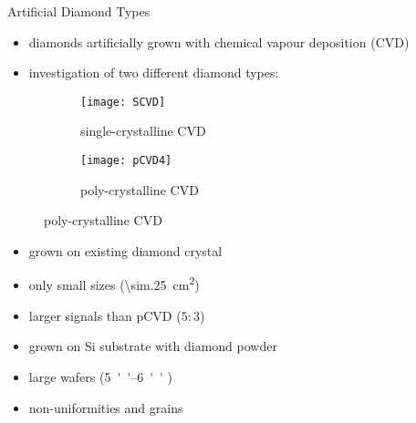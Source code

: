 \begin{frame}{Artificial Diamond Types}

	\begin{itemize}
		\item diamonds artificially grown with chemical vapour deposition (CVD)
		\item investigation of two different diamond types:
	\end{itemize}
	
	\begin{figure}[h] 
		\centering
		\begin{subfigure}{0.45\textwidth}  
			\centering
			\texttt{[image: SCVD]}
			\caption{single-crystalline CVD}
		\end{subfigure}
		\begin{subfigure}{0.45\textwidth} 
			\centering
			\texttt{[image: pCVD4]}
			\caption{poly-crystalline CVD} 	
		\end{subfigure} 
	\end{figure}
	
	\begin{minipage}{5.5cm}
		\begin{itemize}
			\item grown on existing diamond crystal
			\item only small sizes (\SI{\sim.25}{cm^2})
			\item larger signals than pCVD ($5:3$)
		\end{itemize}
	\end{minipage}
	\hspace*{.5cm}
	\begin{minipage}{5cm}
		\begin{itemize}
			\item grown on Si substrate with diamond powder
			\item large wafers (\SIrange{5}{6}{''} \diameter)
			\item non-uniformities and grains
		\end{itemize}
	\end{minipage}
	
\end{frame}
